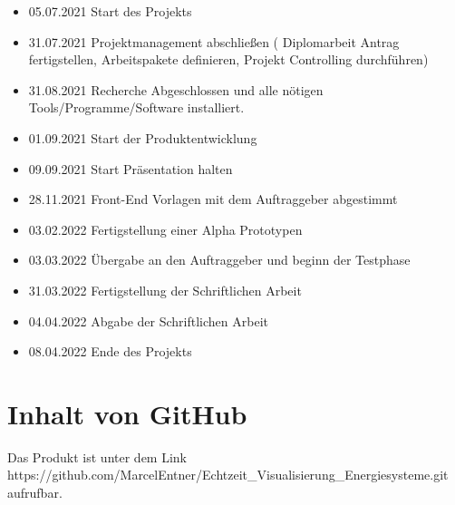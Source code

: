 \begin{itemize}
	\item  05.07.2021 Start des Projekts
	\item 31.07.2021 Projektmanagement abschließen ( Diplomarbeit Antrag fertigstellen, Arbeitspakete definieren, Projekt Controlling durchführen)
	\item  31.08.2021 Recherche Abgeschlossen und alle nötigen Tools/Programme/Software installiert.
	\item 01.09.2021 Start der Produktentwicklung
	\item 09.09.2021 Start Präsentation halten
	\item 28.11.2021 Front-End Vorlagen mit dem Auftraggeber abgestimmt
	\item 03.02.2022 Fertigstellung einer Alpha Prototypen 
	\item 03.03.2022 Übergabe an den Auftraggeber und beginn der Testphase
	\item 31.03.2022 Fertigstellung der Schriftlichen Arbeit
	\item 04.04.2022 Abgabe der Schriftlichen Arbeit 
	\item 08.04.2022 Ende des Projekts 
	
\end{itemize}






\section{Inhalt von GitHub}
Das Produkt ist unter dem Link https://github.com/MarcelEntner/Echtzeit\_Visualisierung\_Energiesysteme.git  aufrufbar.







